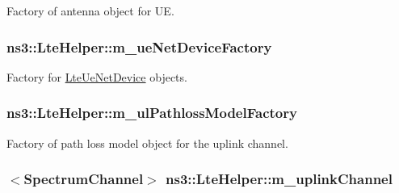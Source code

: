 Factory of antenna object for UE. 

\subsubsection[{\texorpdfstring{m\+\_\+ue\+Net\+Device\+Factory}{m_ueNetDeviceFactory}}]{ ns3\+::\+Lte\+Helper\+::m\+\_\+ue\+Net\+Device\+Factory\hspace{0.3cm}{\ttfamily [private]}}\hypertarget{classns3_1_1LteHelper_acf4f709448cbc362c35b965782d00464}{}\label{classns3_1_1LteHelper_acf4f709448cbc362c35b965782d00464}


Factory for \hyperlink{classns3_1_1LteUeNetDevice}{Lte\+Ue\+Net\+Device} objects. 

\subsubsection[{\texorpdfstring{m\+\_\+ul\+Pathloss\+Model\+Factory}{m_ulPathlossModelFactory}}]{ ns3\+::\+Lte\+Helper\+::m\+\_\+ul\+Pathloss\+Model\+Factory\hspace{0.3cm}{\ttfamily [private]}}\hypertarget{classns3_1_1LteHelper_a2743f7987fdd7372b7a976a8488e3827}{}\label{classns3_1_1LteHelper_a2743f7987fdd7372b7a976a8488e3827}


Factory of path loss model object for the uplink channel. 

\subsubsection[{\texorpdfstring{m\+\_\+uplink\+Channel}{m_uplinkChannel}}]{$<${\bf Spectrum\+Channel}$>$ ns3\+::\+Lte\+Helper\+::m\+\_\+uplink\+Channel\hspace{0.3cm}{\ttfamily [private]}}\hypertarget{classns3_1_1LteHelper_ad61b21e2f55749e680942016b2e57abe}{}\label{classns3_1_1LteHelper_ad61b21e2f55749e680942016b2e57abe}


